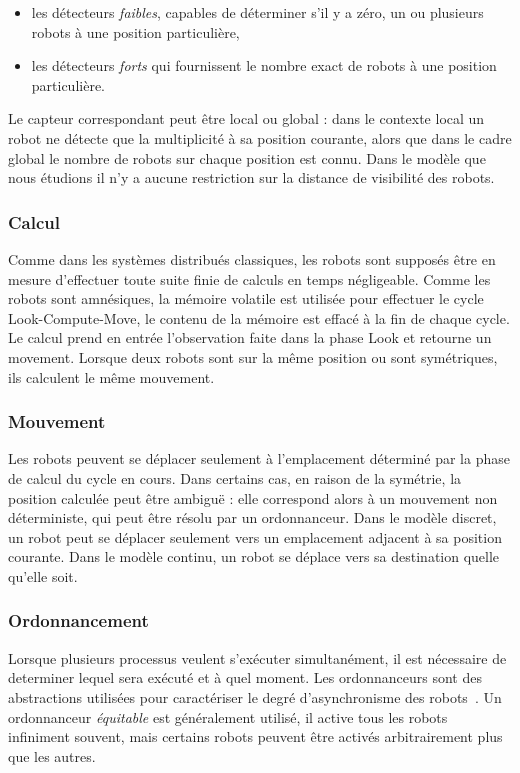 \begin{itemize}
\item les détecteurs \emph{faibles}, capables de déterminer s'il y a
  zéro, un ou plusieurs robots à une position particulière,
\item les détecteurs  \emph{forts} qui fournissent le nombre exact
  de robots à une position particulière.
\end{itemize}
Le capteur correspondant peut être local ou global : dans le contexte
local un robot ne détecte que la multiplicité à sa position courante,
alors que dans le cadre global le nombre de robots sur chaque position
est connu.  Dans le modèle que nous étudions il n'y a aucune
restriction sur la distance de visibilité des robots.

\subsubsection{Calcul}
Comme dans les systèmes distribués classiques, les robots sont
supposés être en mesure d'effectuer toute suite finie de calculs en
temps négligeable. Comme les robots sont amnésiques, la mémoire
volatile est utilisée pour effectuer le cycle Look-Compute-Move, le
contenu de la mémoire est effacé à la fin de chaque cycle.  Le calcul
prend en entrée l'observation faite dans la phase Look et retourne un
movement.  Lorsque deux robots sont sur la même position ou sont
symétriques, ils calculent le même mouvement.

\subsubsection{Mouvement}
Les robots peuvent se déplacer seulement à l'emplacement déterminé par
la phase de calcul du cycle en cours. Dans certains cas, en raison de
la symétrie, la position calculée peut être ambiguë : elle correspond
alors à un mouvement non déterministe, qui peut être résolu par un
ordonnanceur. Dans le modèle discret, un robot peut se déplacer
seulement vers un emplacement adjacent à sa position
courante. Dans le modèle continu, un robot se déplace vers sa
destination quelle qu'elle soit.

\subsubsection{Ordonnancement}
 Lorsque plusieurs processus veulent s'exécuter
simultanément, il est nécessaire de determiner lequel sera exécuté et
à quel moment.  Les ordonnanceurs sont des abstractions utilisées pour
caractériser le degré d'asynchronisme des
robots~\cite{DefagoGMP06,FPS12}.  Un ordonnanceur \emph{équitable} est
généralement utilisé, il active tous les robots infiniment souvent,
mais certains robots peuvent être activés
arbitrairement plus que les autres.

